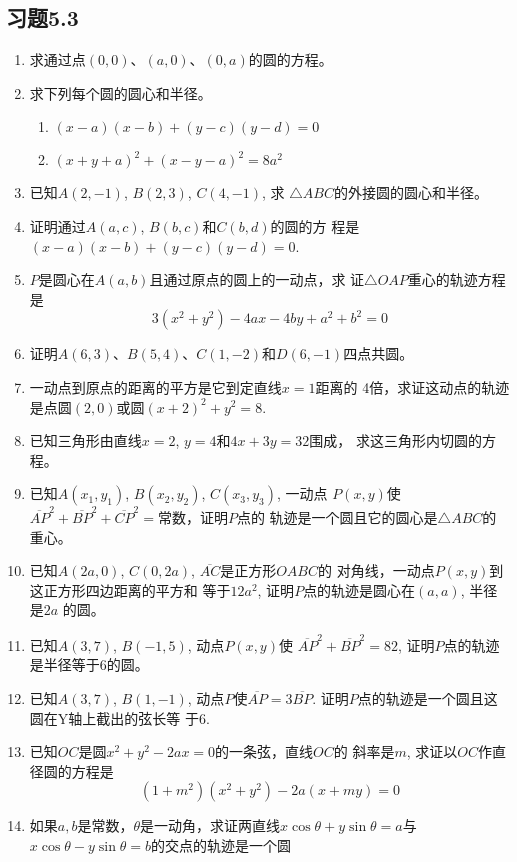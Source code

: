 \subsection*{习题5.3}
\begin{enumerate}

\item 求通过点$(0,0)$、$(a,0)$、$(0,a)$的圆的方程。
\item 求下列每个圆的圆心和半径。
\begin{enumerate}
    \item $(x-a)(x-b)+(y-c)(y-d)=0$
    \item $(x+y+a)^2+(x-y-a)^2=8a^2$
\end{enumerate}

\item 已知$A(2,-1)$, $B(2,3)$, $C(4,-1)$, 求
$\triangle ABC$的外接圆的圆心和半径。
\item 证明通过$A(a,c)$, $B(b,c)$和$C(b,d)$的圆的方
程是$(x-a)(x-b)+(y-c)(y-d)=0$.
\item $P$是圆心在$A(a,b)$且通过原点的圆上的一动点，求
证$\triangle OAP$重心的轨迹方程是
\[3(x^2+y^2)-4ax-4by+a^2+b^2=0\]
\item 证明$A(6,3)$、$B(5,4)$、$C(1,-2)$和$D(6,
-1)$四点共圆。
\item 一动点到原点的距离的平方是它到定直线$x=1$距离的
4倍，求证这动点的轨迹是点圆$(2,0)$或圆$(x+2)^2
+y^2=8$.
\item 已知三角形由直线$x=2$, $y=4$和$4x+3y=32$围成，
求这三角形内切圆的方程。
\item 已知$A(x_1,y_1)$, $B(x_2,y_2)$, $C(x_3,y_3)$, 一动点
$P(x,y)$使$\overline{AP}^2+\overline{BP}^2+\overline{CP}^2=$常数，证明$P$点的
轨迹是一个圆且它的圆心是$\triangle ABC$的重心。
\item 已知$A(2a,0)$, $C(0,2a)$, $\overline{AC}$是正方形$OABC$的
对角线，一动点$P(x,y)$到这正方形四边距离的平方和
等于$12a^2$, 证明$P$点的轨迹是圆心在$(a,a)$, 半径是$2a$
的圆。
\item 已知$A(3,7)$, $B(-1,5)$, 动点$P(x,y)$使
$\overline{AP}^2+\overline{BP}^2=82$, 证明$P$点的轨迹是半径等于6的圆。
\item 已知$A(3,7)$, $B(1,-1)$, 动点$P$使$\overline{AP}=3\overline{BP}$. 
证明$P$点的轨迹是一个圆且这圆在Y轴上截出的弦长等
于6.
\item 已知$OC$是圆$x^2+y^2-2ax=0$的一条弦，直线$OC$的
斜率是$m$, 求证以$OC$作直径圆的方程是
\[(1+m^2)(x^2+y^2)-2a(x+my)=0\]
\item 如果$a,b$是常数，$\theta$是一动角，求证两直线$x\cos\theta+
y\sin\theta=a$与$x\cos\theta-y\sin\theta=b$的交点的轨迹是一个圆

\end{enumerate}
